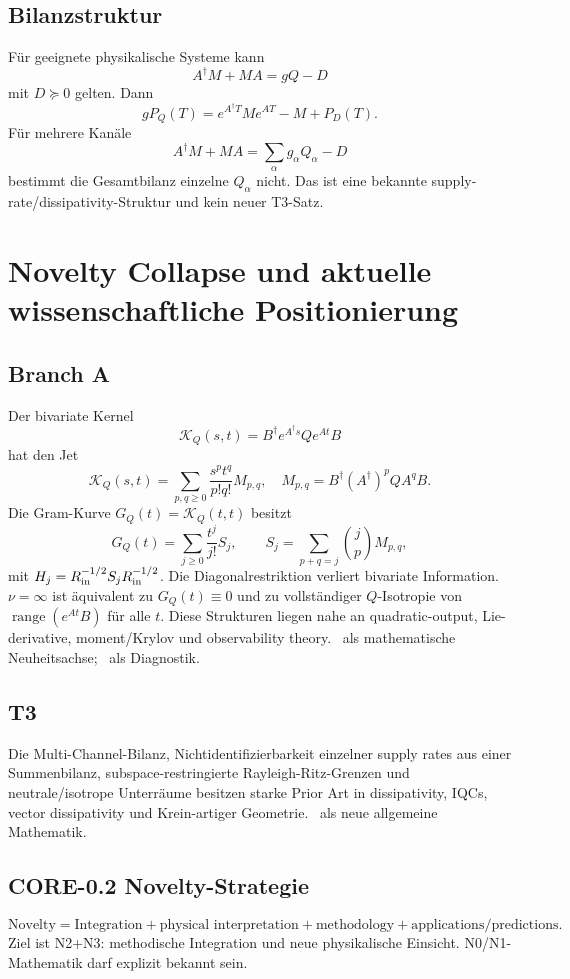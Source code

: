 \subsection{Bilanzstruktur}
Für geeignete physikalische Systeme kann
\[
A^\dagger M+MA=gQ-D
\]
mit $D\succeq0$ gelten. Dann
\[
gP_Q(T)=e^{A^\dagger T}Me^{AT}-M+P_D(T).
\]
Für mehrere Kanäle
\[
A^\dagger M+MA=\sum_\alpha g_\alpha Q_\alpha-D
\]
bestimmt die Gesamtbilanz einzelne $Q_\alpha$ nicht. Das ist eine bekannte supply-rate/dissipativity-Struktur und kein neuer T3-Satz.

\section{Novelty Collapse und aktuelle wissenschaftliche Positionierung}
\subsection{Branch A}
Der bivariate Kernel
\[
\mathcal K_Q(s,t)=B^\dagger e^{A^\dagger s}Qe^{At}B
\]
hat den Jet
\[
\mathcal K_Q(s,t)=\sum_{p,q\ge0}\frac{s^pt^q}{p!q!}M_{p,q},
\quad
M_{p,q}=B^\dagger(A^\dagger)^pQA^qB.
\]
Die Gram-Kurve $G_Q(t)=\mathcal K_Q(t,t)$ besitzt
\[
G_Q(t)=\sum_{j\ge0}\frac{t^j}{j!}S_j,
\qquad
S_j=\sum_{p+q=j}\binom jp M_{p,q},
\]
mit $H_j=R_{\rm in}^{-1/2}S_jR_{\rm in}^{-1/2}$. Die Diagonalrestriktion verliert bivariate Information. $\nu=\infty$ ist äquivalent zu $G_Q(t)\equiv0$ und zu vollständiger $Q$-Isotropie von $\operatorname{range}(e^{At}B)$ für alle $t$. Diese Strukturen liegen nahe an quadratic-output, Lie-derivative, moment/Krylov und observability theory. \COLLAPSED\ als mathematische Neuheitsachse; \STABLE\ als Diagnostik.

\subsection{T3}
Die Multi-Channel-Bilanz, Nichtidentifizierbarkeit einzelner supply rates aus einer Summenbilanz, subspace-restringierte Rayleigh-Ritz-Grenzen und neutrale/isotrope Unterräume besitzen starke Prior Art in dissipativity, IQCs, vector dissipativity und Krein-artiger Geometrie. \COLLAPSED\ als neue allgemeine Mathematik.

\subsection{CORE-0.2 Novelty-Strategie}
\[
\boxed{\text{Novelty}=\text{Integration}+\text{physical interpretation}+\text{methodology}+\text{applications/predictions}.}
\]
Ziel ist N2+N3: methodische Integration und neue physikalische Einsicht. N0/N1-Mathematik darf explizit bekannt sein.
